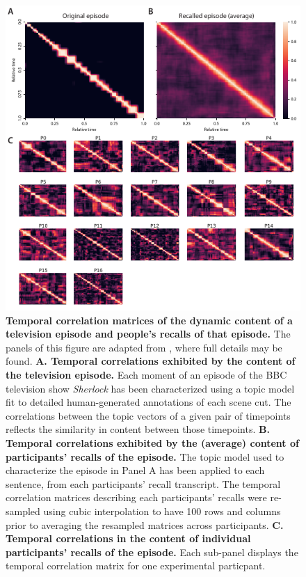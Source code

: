 \documentclass{article}
\begin{document}
\begin{figure}[tp] \centering \includegraphics[width=\textwidth]{figs/pres_rec_corrmats_sherlock} \caption{\textbf{Temporal correlation matrices of the dynamic content of a television episode and people's recalls of that episode.}  The panels of this figure are adapted from \cite{HeusEtal18c}, where full details may be found. \textbf{A. Temporal correlations exhibited by the content of the television episode.}  Each moment of an episode of the BBC television show \textit{Sherlock} has been characterized using a topic model~\citep{BleiEtal03} fit to detailed human-generated annotations of each scene cut.  The correlations between the topic vectors of a given pair of timepoints reflects the similarity in content between those timepoints.  \textbf{B. Temporal correlations exhibited by the (average) content of participants' recalls of the episode.} The topic model used to characterize the episode in Panel A has been applied to each sentence, from each participants' recall transcript.  The temporal correlation matrices describing each participants' recalls were re-sampled using cubic interpolation to have 100 rows and columns prior to averaging the resampled matrices across participants.  \textbf{C. Temporal correlations in the content of individual participants' recalls of the episode.} Each sub-panel displays the temporal correlation matrix for one experimental particpant.}
\label{fig:corrmats}
\end{figure}
\end{document}
